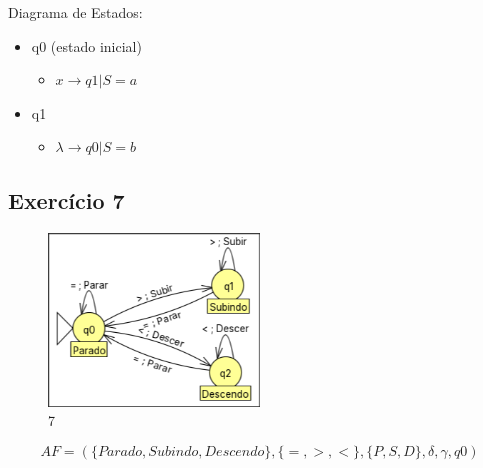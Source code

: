         Diagrama de Estados:
        \begin{itemize}
            \item q0 (estado inicial)
                \begin{itemize}
                    \item $x \to q1 | S = a$
                \end{itemize}
            \item q1
                \begin{itemize}
                    \item $\lambda \to q0 | S = b$
                \end{itemize}
        \end{itemize}

    \subsection{Exercício 7}
        \begin{figure}[H]
            \centering
            \includegraphics[width=0.5\textwidth]{images/Aula07/7.png}
            \caption*{7}
        \end{figure}
        
        \[AF = (\{Parado, Subindo, Descendo\}, \{=, >, <\}, \{P, S, D\}, \delta, \gamma, q0)\]
        
